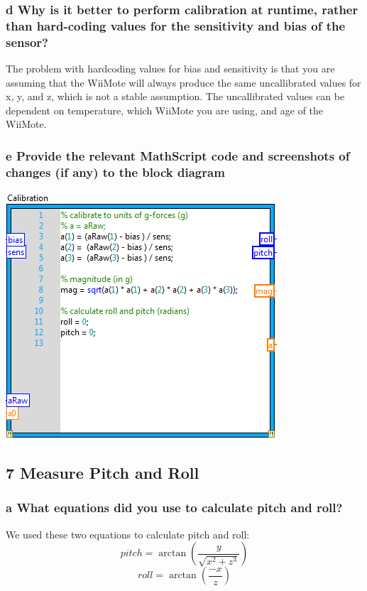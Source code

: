 \documentclass[10pt,a4paper]{article}
\begin{document}
    \subsubsection*{d Why is it better to perform calibration at runtime, rather than hard-coding values for the sensitivity and bias of the sensor?}
      The problem with hardcoding values for bias and sensitivity is that you are assuming that the WiiMote will always produce the same uncallibrated values for x, y, and z, which is not a stable assumption. The uncallibrated values can be dependent on temperature, which WiiMote you are using, and age of the WiiMote. 
    \subsubsection*{e Provide the relevant MathScript code and screenshots of changes (if any) to the block diagram}
    \includegraphics{../lab1_data/lab1_6e.PNG} 
  \subsection*{7 Measure Pitch and Roll}
    \subsubsection*{a What equations did you use to calculate pitch and roll?}
      We used these two equations to calculate pitch and roll:
        \[pitch = \arctan(\frac{y}{\sqrt{x^2 + z^3}})\]
        \[roll = \arctan(\frac{-x}{z})\]
\end{document}
